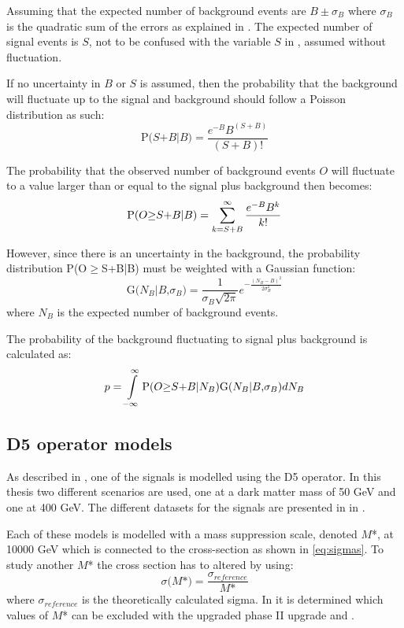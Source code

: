 Assuming that the expected number of background events are $B \pm \sigma_B$ where $\sigma_B$ is the quadratic sum of the errors as explained in . The expected number of signal events is $S$, not to be confused with the variable $S$ in , assumed without fluctuation. 

If no uncertainty in $B$ or $S$ is assumed, then the probability that the background will fluctuate up to the signal and background should follow a Poisson distribution as such:
\begin{equation}
\text{P($S$+$B$|$B$)}=\frac{e^{-B}B^{(S+B)}}{(S+B)!}
\end{equation} 

The probability that the observed number of background events $O$ will fluctuate to a value larger than or equal to the signal plus background then becomes:
\begin{equation}
\text{P($O$$ \geq$$S$+$B$|$B$)} =\sum_{k=S+B}^{\infty}  \frac{e^{-B}B^k}{k!}
\end{equation} 

However, since there is an uncertainty in the background, the probability distribution P(O$ \geq$S+B|B) must be weighted with a Gaussian function:
\begin{equation}
 \text{G($N_B$|$B$,$\sigma_B$)}=\frac{1}{\sigma_B \sqrt{2 \pi}} e^{-\frac{(N_B-B)^2}{2\sigma_B^2}}
\end{equation}
where $N_B$ is the expected number of background events. 

The probability of the background fluctuating to signal plus background is calculated as:
\begin{equation}
p = \int\limits_{-\infty}^{\infty} \text{P($O$$ \geq$$S$+$B$|$N_B$)G($N_B$|$B$,$\sigma_B$)} dN_B
\end{equation}

\subsection{D5 operator models}\label{sec:signal:subsec:d5}
As described in , one of the signals is modelled using the D5 operator. In this thesis two different scenarios are used, one at a dark matter mass of 50 GeV and one at 400 GeV. The different datasets for the signals are presented in  in .

Each of these models is modelled with a mass suppression scale, denoted $M$*, at 10000 GeV which is connected to the cross-section as shown in \eqref{eq:sigmas}. To study another $M$* the cross section has to altered by using:
\begin{equation}\label{eq:sigmas}
\sigma \text{($M$*)} = \frac{\sigma_{reference}}{\text{$M$*}} 
\end{equation}
where $\sigma_{reference}$ is the theoretically calculated sigma.
In  it is determined which values of $M$* can be excluded with the upgraded \abbrLHC phase II upgrade and \abbrATLAS .


